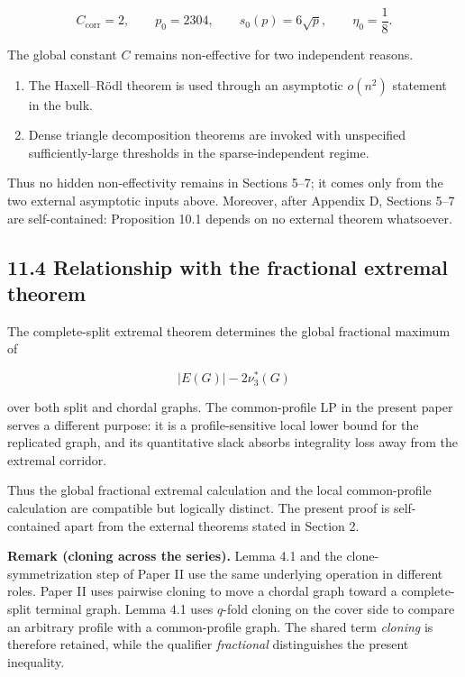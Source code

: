 \documentclass[
  11pt,
]{article}
\providecommand{\tightlist}{%
  \setlength{\itemsep}{0pt}\setlength{\parskip}{0pt}}
\begin{document}
\[
C_{\mathrm{corr}}=2,
\qquad
p_0=2304,
\qquad
s_0(p)=6\sqrt p,
\qquad
\eta_0=\frac18.
\]

The global constant \(C\) remains non-effective for two independent
reasons.

\begin{enumerate}
\def\labelenumi{\arabic{enumi}.}
\tightlist
\item
  The Haxell--Rödl theorem is used through an asymptotic \(o(n^2)\)
  statement in the bulk.
\item
  Dense triangle decomposition theorems are invoked with unspecified
  sufficiently-large thresholds in the sparse-independent regime.
\end{enumerate}

Thus no hidden non-effectivity remains in Sections 5--7; it comes only
from the two external asymptotic inputs above. Moreover, after Appendix
D, Sections 5--7 are self-contained: Proposition 10.1 depends on no
external theorem whatsoever.

\subsection{11.4 Relationship with the fractional extremal
theorem}\label{relationship-with-the-fractional-extremal-theorem}

The complete-split extremal theorem determines the global fractional
maximum of

\[
|E(G)|-2\nu_3^*(G)
\]

over both split and chordal graphs. The common-profile LP in the present
paper serves a different purpose: it is a profile-sensitive local lower
bound for the replicated graph, and its quantitative slack absorbs
integrality loss away from the extremal corridor.

Thus the global fractional extremal calculation and the local
common-profile calculation are compatible but logically distinct. The
present proof is self-contained apart from the external theorems stated
in Section 2.

\textbf{Remark (cloning across the series).} Lemma 4.1 and the
clone-symmetrization step of Paper II use the same underlying operation
in different roles. Paper II uses pairwise cloning to move a chordal
graph toward a complete-split terminal graph. Lemma 4.1 uses \(q\)-fold
cloning on the cover side to compare an arbitrary profile with a
common-profile graph. The shared term \emph{cloning} is therefore
retained, while the qualifier \emph{fractional} distinguishes the
present inequality.
\end{document}
